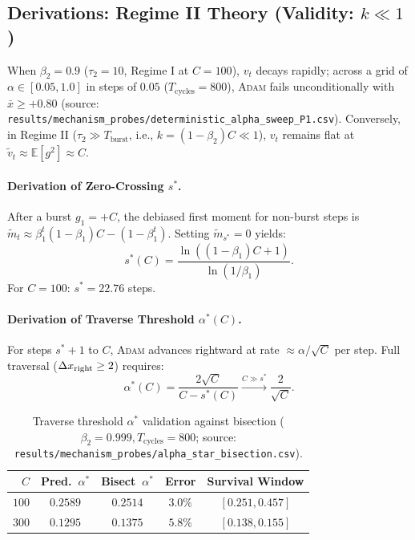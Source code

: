 \subsection{Derivations: Regime II Theory (Validity: $k \ll 1$)}
When $\beta_2=0.9$ ($\tau_2=10$, Regime I at $C=100$), $v_t$ decays rapidly; across a grid of $\alpha \in [0.05, 1.0]$ in steps of $0.05$ ($T_{\text{cycles}}=800$), \textsc{Adam} fails unconditionally with $\bar{x} \ge +0.80$ (source: \nolinkurl{results/mechanism_probes/deterministic_alpha_sweep_P1.csv}). Conversely, in Regime II ($\tau_2 \gg T_{\text{burst}}$, i.e., $k=(1-\beta_2)C \ll 1$), $v_t$ remains flat at $\tilde{v}_t \approx \mathbb{E}[g^2] \approx C$.

\paragraph{Derivation of Zero-Crossing $s^*$.}
After a burst $g_1=+C$, the debiased first moment for non-burst steps is $\tilde{m}_t \approx \beta_1^t(1-\beta_1)C - (1-\beta_1^t)$. Setting $\tilde{m}_{s^*}=0$ yields:
\begin{equation}
    s^*(C) = \frac{\ln\left((1-\beta_1)C+1\right)}{\ln(1/\beta_1)}.
    \label{eq:s_star_exact}
\end{equation}
For $C=100$: $s^*=22.76$ steps.

\paragraph{Derivation of Traverse Threshold $\alpha^*(C)$.}
For steps $s^*+1$ to $C$, \textsc{Adam} advances rightward at rate $\approx \alpha/\sqrt{C}$ per step. Full traversal ($\Delta x_{\rm right} \ge 2$) requires:
\begin{equation}
    \alpha^*(C) = \frac{2\sqrt{C}}{C - s^*(C)} \xrightarrow{C\gg s^*} \frac{2}{\sqrt{C}}.
    \label{eq:alpha_star_derived}
\end{equation}

\begin{table}[ht]
\centering
\scriptsize
\setlength{\tabcolsep}{3.5pt}
\caption{Traverse threshold $\alpha^*$ validation against bisection ($\beta_2=0.999, T_{\text{cycles}}=800$; source: \nolinkurl{results/mechanism_probes/alpha_star_bisection.csv}).}
\label{tab:alpha_star_validation}
\begin{tabular}{@{}r c c c c@{}}
\toprule
$C$ & Pred.~$\alpha^*$ & Bisect~$\alpha^*$ & Error & Survival Window \\
\midrule
$100$ & $0.2589$ & $0.2514$ & $3.0\%$ & $[0.251, 0.457]$ \\
$300$ & $0.1295$ & $0.1375$ & $5.8\%$ & $[0.138, 0.155]$ \\
\bottomrule
\end{tabular}
\end{table}

